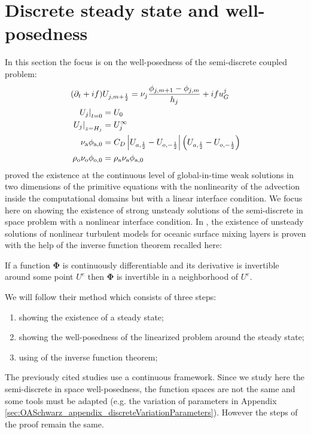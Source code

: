 \section{Discrete steady state and well-posedness}
\label{sec:OASchwarz_DiscreteStationaryState}
In this section the focus is on the well-posedness of
the semi-discrete coupled problem:
\begin{subequations}
\label{eq:OASchwarz_SemiDiscreteCoupledProblem}
\begin{align}
(\partial_t + if) &U_{j, m+\frac{1}{2}} = \nu_j
	\frac{\phi_{j,m+1} - \phi_{j,m}}{h_j} + if u_G^j
\\
	\left.U_j\right|_{t=0} &= U_0\\
	\left.U_j\right|_{z=H_j} &= U_j^\infty\\
	\nu_{\rm a}\phi_{{\rm a}, 0} &=  C_D
\left|
	{U}_{a, \frac{1}{2}}
-
	{U}_{o, -\frac{1}{2}}
\right|
\left(
	{U}_{a, \frac{1}{2}}
-
	{U}_{o, -\frac{1}{2}}
\right)
\label{eq:bulkInterfaceConditionSemiDiscrete}\\
	\rho_{\rm o} \nu_{\rm o}\phi_{{\rm o}, 0} &= \rho_{\rm a}
	\nu_{\rm a}\phi_{{\rm a}, 0}
\label{eq:fluxInterfaceConditionSemiDiscrete}
\end{align}
\end{subequations}
\citep{lions_mathematical_1995} proved the existence at the
continuous level
of global-in-time weak solutions in
two dimensions of the primitive equations with
the nonlinearity of the advection inside the
computational domains but with a linear
interface condition.
We focus here on showing the existence of strong
unsteady solutions of the semi-discrete in space
problem with a nonlinear interface condition.
In \citep{chacon-rebollo_existence_2014},
the existence of unsteady solutions of
nonlinear turbulent models for oceanic surface mixing layers is
proven with the help of the inverse function theorem recalled here:
\begin{invFuncTheorem}
	If a function $\mathbf{\Phi}$
	is continuously differentiable and
	its derivative is invertible around some point $U^e$
	then $\mathbf{\Phi}$ is invertible in a neighborhood of $U^e$.
\end{invFuncTheorem}
\par
We will follow their method which consists of three steps:
\begin{enumerate}
	\item showing the existence of a steady state;
	\item showing the well-posedness of the linearized problem
	around the steady state;
	\item using of the inverse function theorem;
\end{enumerate}
The previously cited studies use a continuous framework.
Since we study here the semi-discrete in space well-posedness,
the function spaces are not the same and some tools must be adapted
(e.g. the variation of parameters in Appendix
\ref{sec:OASchwarz_appendix_discreteVariationParameters}).
However the steps of the proof remain the same.

